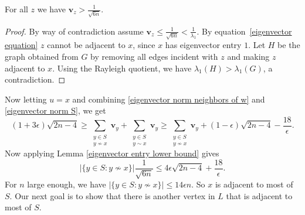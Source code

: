 \begin{lemma}\label{eigenvector entry lower bound}
For all $z$ we have $\mathbf{v}_z>\frac{1}{\sqrt{6n}}$.
\end{lemma}
\begin{proof}
  By way of contradiction assume $\mathbf{v}_z\leq \frac{1}{\sqrt{6n}} < \frac{1}{\lambda_1}$. By
  equation~\eqref{eigenvector equation} $z$ cannot be adjacent to $x$, since
  $x$ has eigenvector entry $1$. Let $H$ be the graph obtained from $G$ by removing all edges incident with $z$ and making $z$ adjacent to $x$. Using the Rayleigh quotient, we have $\lambda_1(H) > \lambda_1(G)$, a contradiction.
\end{proof}

\noindent Now letting $u=x$ and combining \eqref{eigenvector norm neighbors of w} and \eqref{eigenvector norm S}, we get 
\[
(1+3\epsilon)\sqrt{2n-4} \geq \sum_{\substack{y\in S\\ y\not\sim x}} \mathbf{v}_y + \sum_{\substack{y\in S\\ y\sim x}} \mathbf{v}_y \geq \sum_{\substack{y\in S\\ y\not\sim x}} \mathbf{v}_y + (1-\epsilon)\sqrt{2n-4} - \frac{18}{\epsilon}.
\]
Now applying Lemma \ref{eigenvector entry lower bound} gives
\[
|\{y\in S: y\not\sim x\}| \frac{1}{\sqrt{6n} }\leq 4\epsilon \sqrt{2n-4} + \frac{18}{\epsilon}.
\]
For $n$ large enough, we have $|\{y\in S: y\not\sim x\}| \leq 14\epsilon n$. So $x$ is adjacent to most of $S$. Our next goal is to show that there is another vertex in $L$ that is adjacent to most of $S$.

